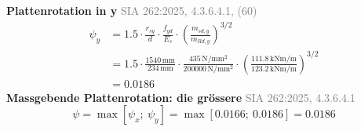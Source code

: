 \documentclass[11pt,a4paper]{article}
\newcommand{\normref}[1]{{\small\textcolor{gray}{#1}}}
\begin{document}
\noindent\textbf{Plattenrotation in y} \hfill \normref{SIA 262:2025, 4.3.6.4.1, (60)}
\begin{equation*}
\begin{aligned}
  \psi_y &= 1.5 \cdot \frac{r_{sy}}{d} \cdot \frac{f_{yd}}{E_s} \cdot \left(\frac{m_{sd,y}}{m_{Rd,y}}\right)^{3/2} \\
  &= 1.5 \cdot \frac{1540\,\mathrm{mm}}{234\,\mathrm{mm}} \cdot \frac{435\,\mathrm{N}/\mathrm{mm}^{2}}{200000\,\mathrm{N}/\mathrm{mm}^{2}} \cdot \left(\frac{111.8\,\mathrm{kNm}/\mathrm{m}}{123.2\,\mathrm{kNm}/\mathrm{m}}\right)^{3/2} \\
  &= 0.0186
\end{aligned}
\end{equation*}
\noindent\textbf{Massgebende Plattenrotation: die grössere} \hfill \normref{SIA 262:2025, 4.3.6.4.1}
\begin{equation*}
\psi = \max\left[\psi_x;\ \psi_y\right] = \max\left[0.0166;\ 0.0186\right] = 0.0186
\end{equation*}
\end{document}

